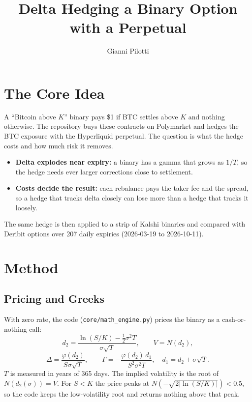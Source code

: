 \documentclass[11pt,a4paper]{article}
\title{Delta Hedging a Binary Option with a Perpetual}
\author{Gianni Pilotti}
\date{}
\begin{document}
\maketitle

\section{The Core Idea}

A ``Bitcoin above $K$'' binary pays \$1 if BTC settles above $K$ and nothing otherwise. The repository buys these contracts on Polymarket and hedges the BTC exposure with the Hyperliquid perpetual. The question is what the hedge costs and how much risk it removes.

\begin{itemize}
\item \textbf{Delta explodes near expiry:} a binary has a gamma that grows as $1/T$, so the hedge needs ever larger corrections close to settlement.
\item \textbf{Costs decide the result:} each rebalance pays the taker fee and the spread, so a hedge that tracks delta closely can lose more than a hedge that tracks it loosely.
\end{itemize}

The same hedge is then applied to a strip of Kalshi binaries and compared with Deribit options over 207 daily expiries (2026-03-19 to 2026-10-11).

\section{Method}

\subsection{Pricing and Greeks}

With zero rate, the code (\texttt{core/math\_engine.py}) prices the binary as a cash-or-nothing call:
\begin{equation}
d_2=\frac{\ln(S/K)-\tfrac12\sigma^2T}{\sigma\sqrt T},\qquad V=N(d_2),
\end{equation}
\begin{equation}
\Delta=\frac{\varphi(d_2)}{S\sigma\sqrt T},\qquad
\Gamma=-\frac{\varphi(d_2)\,d_1}{S^2\sigma^2T},\quad d_1=d_2+\sigma\sqrt T .
\end{equation}
$T$ is measured in years of 365 days. The implied volatility is the root of $N(d_2(\sigma))=V$. For $S<K$ the price peaks at $N(-\sqrt{2|\ln(S/K)|})<0.5$, so the code keeps the low-volatility root and returns nothing above that peak.
\end{document}
